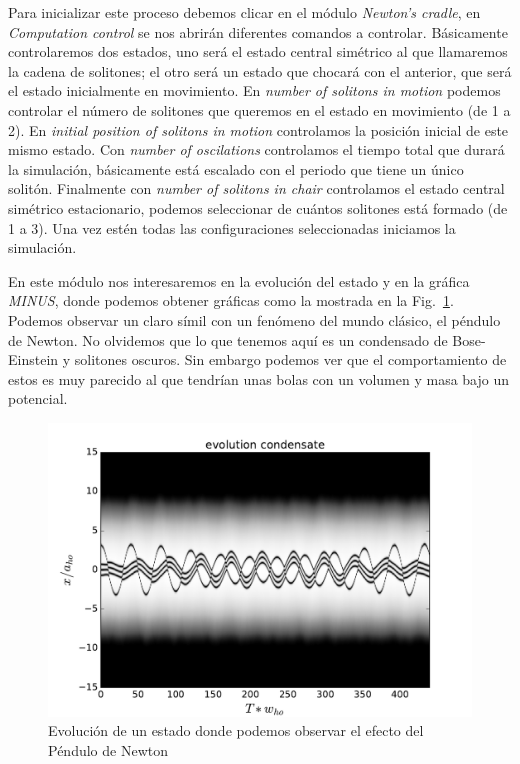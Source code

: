 Para inicializar este proceso debemos clicar en el m\'odulo \textit{Newton's cradle}, en \textit{Computation control} se nos abrir\'an diferentes comandos a controlar. B\'asicamente controlaremos dos estados, uno ser\'a el estado central sim\'etrico al que llamaremos la cadena de solitones; el otro ser\'a un estado que chocar\'a con el anterior, que ser\'a el estado inicialmente en movimiento. En \textit{number of solitons in motion} podemos controlar el n\'umero de solitones que queremos en el estado en movimiento (de 1 a 2). En \textit{initial position of solitons in motion} controlamos la posici\'on inicial de este mismo estado. Con \textit{number of oscilations} controlamos el tiempo total que durar\'a la simulaci\'on, b\'asicamente est\'a escalado con el periodo que tiene un \'unico solit\'on. Finalmente con \textit{number of solitons in chair} controlamos el estado central sim\'etrico estacionario, podemos seleccionar de cu\'antos solitones est\'a formado (de 1 a 3). Una vez est\'en todas las configuraciones seleccionadas iniciamos la simulaci\'on. 

En este m\'odulo nos interesaremos en la evoluci\'on del estado y en la gr\'afica \textit{MINUS}, donde podemos obtener gr\'aficas como la mostrada en la Fig.~\ref{Fig:new_crand}. Podemos observar un claro s\'imil con un fen\'omeno del mundo cl\'asico, el p\'endulo de Newton. No olvidemos que lo que tenemos aqu\'i es un condensado de Bose-Einstein y solitones oscuros. Sin embargo podemos ver que el comportamiento de estos es muy parecido al que tendr\'ian unas bolas con un volumen y masa bajo un potencial. 

\begin{figure}[tb]
	\centering
	\includegraphics[width=0.9\linewidth]{new_crand.pdf}
	\caption{Evoluci\'on de un estado donde podemos observar el efecto del P\'endulo de Newton}
	\label{Fig:new_crand}
\end{figure}


